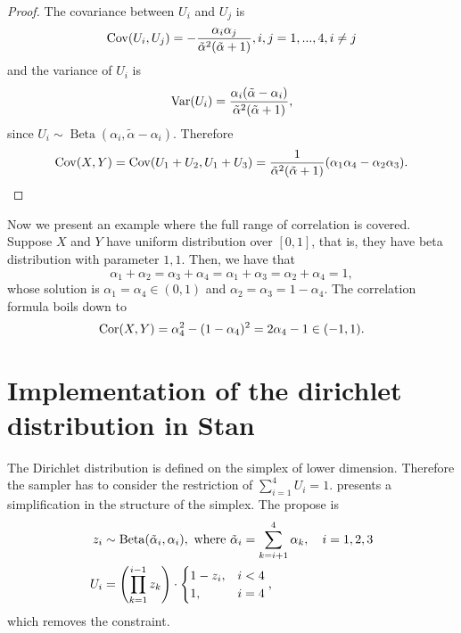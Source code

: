 \begin{proof}

  The covariance between $U_i$ and $U_j$ is \cite[p. 11]{lin2016dirichlet} 
\begin{equation}
  \operatorname{Cov}(U_i, U_j) = - \frac{\alpha_i\alpha_j}{\tilde{\alpha}^2(\tilde{\alpha}+1)}, i,j = 1,...,4, i \neq j
\end{equation} 
and the variance of $U_i$ is 
\begin{equation}
  \operatorname{Var}(U_i) = \frac{\alpha_i(\tilde{\alpha}-\alpha_i)}{\tilde{\alpha}^2(\tilde{\alpha}+1)},
\end{equation}
since $U_i \sim \operatorname{Beta}(\alpha_i, \tilde{\alpha} -\alpha_i)$.
Therefore 
\begin{equation}
  \operatorname{Cov}(X,Y) = \operatorname{Cov}(U_1+U_2, U_1+U_3) = \frac{1}{\tilde{\alpha}^2(\tilde{\alpha}+1)}(\alpha_1\alpha_4 - \alpha_2\alpha_3).
\end{equation}
  
\end{proof}

Now we present an example where the full range of correlation is covered.
Suppose $X$ and $Y$ have uniform distribution over $[0,1]$, that is, they have
beta distribution with parameter $1,1$. Then, we have that 
$$\alpha_1 +
\alpha_2 = \alpha_3 + \alpha_4 = \alpha_1 + \alpha_3 = \alpha_2 + \alpha_4 = 1,$$
whose solution is $\alpha_1 = \alpha_4 \in (0,1)$ and $\alpha_2 = \alpha_3 = 1
- \alpha_4$. The correlation formula boils down to 
$$\operatorname{Cor}(X,Y) = \alpha_4^2 - (1 - \alpha_4)^2 = 2\alpha_4 - 1 \in (-1,1).$$

\section{Implementation of the dirichlet distribution in Stan}

The Dirichlet distribution is defined on the simplex of lower dimension.
Therefore the sampler has to consider the restriction of $\sum_{i=1}^4 U_i =
  1$. \textcite{betancourt2012cruising} presents a simplification in the
structure of the simplex. The propose is \cite[p. 2]{betancourt2012cruising}
\begin{equation*}
  \begin{aligned}
    z_i & \sim \operatorname{Beta}(\tilde{\alpha}_i, \alpha_i), \text{ where } \tilde{\alpha}_i = \sum_{k=i+1}^4 \alpha_k, \quad i = 1,2,3 \\
    U_i & = \left(\prod_{k=1}^{i-1} z_k\right)\cdot \begin{cases}
      1 - z_i, & i < 4 \\
      1,       & i = 4
    \end{cases},
  \end{aligned}
\end{equation*}
which removes the constraint.

